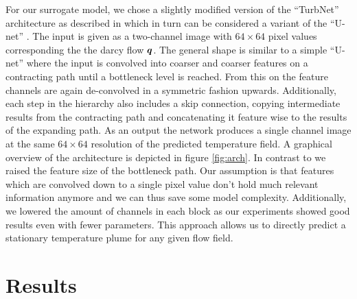 \documentclass{article} %
\begin{document}
For our surrogate model, we chose a slightly modified version of the ``TurbNet'' architecture as described in \citet{Thuerey2019} which in turn can be considered a variant of the ``U-net'' \citep{Ronneberger2015}.
The input is given as a two-channel image with $64\times64$ pixel values corresponding the the darcy flow ${\bm{q}}$.
The general shape is similar to a simple ``U-net'' where the input is convolved into coarser and coarser features on a contracting path until a bottleneck level is reached. 
From this on the feature channels are again de-convolved in a symmetric fashion upwards.
Additionally, each step in the hierarchy also includes a skip connection, copying intermediate results from the contracting path and concatenating it feature wise to the results of the expanding path.
As an output the network produces a single channel image at the same $64\times64$ resolution of the predicted temperature field.
A graphical overview of the architecture is depicted in figure \ref{fig:arch}.
In contrast to \citep{Thuerey2019} we raised the feature size of the bottleneck path.
Our assumption is that features which are convolved down to a single pixel value don't hold much relevant information anymore and we can thus save some model complexity.
Additionally, we lowered the amount of channels in each block as our experiments showed good results even with fewer parameters.
This approach allows us to directly predict a stationary temperature plume for any given flow field.



\section{Results}
\label{sec:results}

\end{document}
